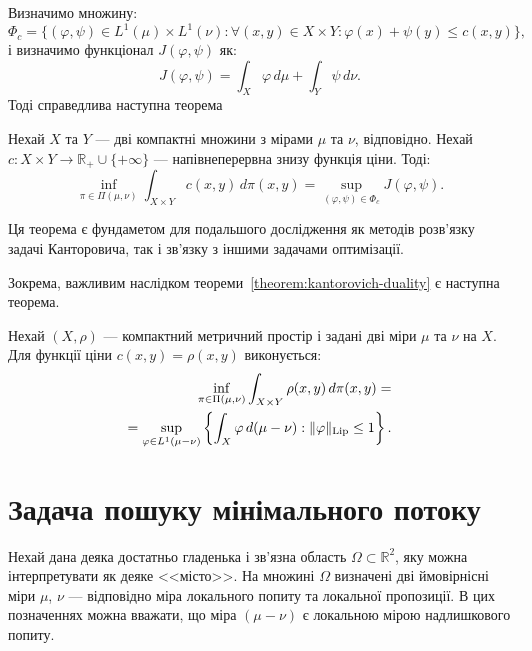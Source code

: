 Визначимо множину:
$$
    \Phi_c = \{(\varphi, \psi) \in L^1(\mu) \times L^1(\nu) : \forall (x, y) \in X \times Y : \varphi(x) + \psi(y) \le c(x, y)\},
$$
і визначимо функціонал $J(\varphi, \psi)$ як:
$$
    J(\varphi, \psi) = \int_X \varphi\, d\mu + \int_Y \psi\, d\nu.
$$
Тоді справедлива наступна теорема

\begin{theorem}
    \label{theorem:kantorovich-duality}
    Нехай $X$ та $Y$ --- дві компактні множини з мірами $\mu$ та $\nu$, відповідно. 
    Нехай $c : X \times Y \to \mathbb{R}_+ \cup \{+\infty\}$ --- напівнеперервна знизу функція ціни. Тоді:
    $$
        \inf_{\pi \in \Pi(\mu, \nu)} \int_{X \times Y} c(x, y)\, d\pi(x, y) = \sup_{(\varphi, \psi) \in \Phi_c} J(\varphi, \psi).
    $$
\end{theorem}

Ця теорема є фундаметом для подальшого дослідження як методів розв'язку задачі Канторовича,
так і зв'язку з іншими задачами оптимізації. 

Зокрема, важливим наслідком теореми~\ref{theorem:kantorovich-duality} є наступна теорема.

\begin{theorem}
    \label{theorem:kr-duality}
    Нехай $(X, \rho)$ --- компактний метричний простір і задані дві міри $\mu$ та $\nu$ на $X$.
    Для функції ціни $c(x, y) = \rho(x, y)$ виконується:
    \begin{equation}
        \begin{aligned}
            \label{eq:kr-duality}
            \inf_{\pi \in \Pi(\mu, \nu)} \int_{X \times Y} \rho(x, y)\, d\pi(x, y) = \\
            = \sup_{\varphi \in L^1(\mu - \nu)} 
            \left\{
                \int_X \varphi\, d(\mu - \nu) : \|\varphi\|_{\text{Lip}} \le 1
            \right\}.
        \end{aligned}
    \end{equation}
\end{theorem}

\section{Задача пошуку мінімального потоку}
\label{sec:min-flow-problem}

Нехай дана деяка достатньо гладенька і зв'язна область $\Omega \subset \mathbb{R}^2$,
яку можна інтерпретувати як деяке <<місто>>.
На множині $\Omega$ визначені дві ймовірнісні міри $\mu$, $\nu$ --- відповідно міра локального попиту 
та локальної пропозиції.
В цих позначеннях можна вважати, що міра $(\mu - \nu)$ є локальною мірою надлишкового попиту.

